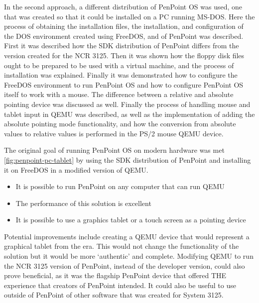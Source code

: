 In the second approach, a different distribution of PenPoint OS was used, one
that was created so that it could be installed on a PC running MS-DOS.  Here the
process of obtaining the installation files, the installation, and configuration
of the DOS environment created using FreeDOS, and of PenPoint was described.
First it was described how the SDK distribution of PenPoint differs from the
version created for the NCR 3125.  Then it was shown how the floppy disk files
ought to be prepared to be used with a virtual machine, and the process of
installation was explained.  Finally it was demonstrated how to configure the
FreeDOS environment to run PenPoint OS and how to configure PenPoint OS itself
to work with a mouse.  The difference between a relative and absolute pointing
device was discussed as well.  Finally the process of handling mouse and tablet
input in QEMU was described, as well as the implementation of adding the
absolute pointing mode functionality, and how the conversion from absolute
values to relative values is performed in the PS/2 mouse QEMU device.


The original goal of running PenPoint OS on modern hardware was met
\ref{fig:penpoint-pc-tablet} by using the SDK distribution of PenPoint and
installing it on FreeDOS in a modified version of QEMU.

\begin{itemize}
    \item
        It is possible to run PenPoint on any computer that can run QEMU
    \item
        The performance of this solution is excellent
    \item
        It is possible to use a graphics tablet or a touch screen as a pointing
        device
\end{itemize}


Potential improvements include creating a QEMU device that would represent
a graphical tablet from the era.  This would not change the functionality
of the solution but it would be more `authentic' and complete.  Modifying QEMU
to run the NCR 3125 version of PenPoint, instead of the developer version, could
also prove beneficial, as it was the flagship PenPoint device that offered THE
experience that creators of PenPoint intended.  It could also be useful to use
outside of PenPoint of other software that was created for System 3125.


